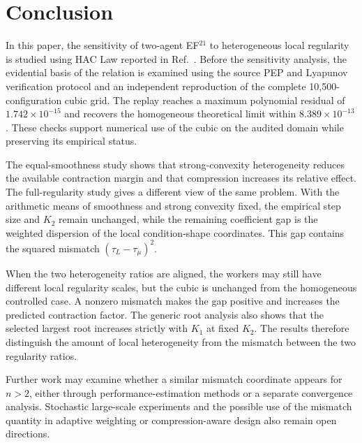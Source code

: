 \section{Conclusion}

In this paper, the sensitivity of two-agent EF$^{21}$ to heterogeneous local regularity is studied using HAC Law reported in Ref.~\cite{thomsen2026tight}. Before the sensitivity analysis, the evidential basis of the relation is examined using the source PEP and Lyapunov verification protocol and an independent reproduction of the complete 10,500-configuration cubic grid. The replay reaches a maximum polynomial residual of $1.742\times10^{-15}$ and recovers the homogeneous theoretical limit within $8.389\times10^{-13}$. These checks support numerical use of the cubic on the audited domain while preserving its empirical status.

The equal-smoothness study shows that strong-convexity heterogeneity reduces the available contraction margin and that compression increases its relative effect. The full-regularity study gives a different view of the same problem. With the arithmetic means of smoothness and strong convexity fixed, the empirical step size and $K_2$ remain unchanged, while the remaining coefficient gap is the weighted dispersion of the local condition-shape coordinates. This gap contains the squared mismatch $(\tau_L-\tau_\mu)^2$.

When the two heterogeneity ratios are aligned, the workers may still have different local regularity scales, but the cubic is unchanged from the homogeneous controlled case. A nonzero mismatch makes the gap positive and increases the predicted contraction factor. The generic root analysis also shows that the selected largest root increases strictly with $K_1$ at fixed $K_2$. The results therefore distinguish the amount of local heterogeneity from the mismatch between the two regularity ratios.

Further work may examine whether a similar mismatch coordinate appears for $n>2$, either through performance-estimation methods or a separate convergence analysis. Stochastic large-scale experiments and the possible use of the mismatch quantity in adaptive weighting or compression-aware design also remain open directions.




